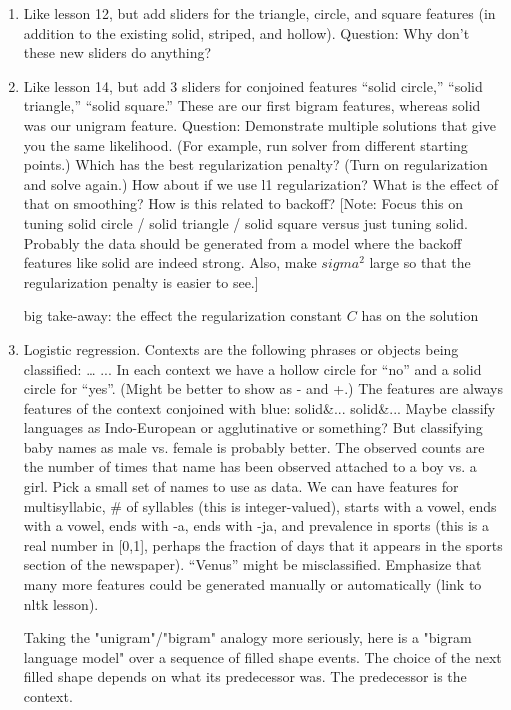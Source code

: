 \documentclass[11pt,letterpaper]{article}
\begin{document}
{\begin{enumerate}[resume]
In the English (circle) context, it is now only possible to talk about solid. Since English is popular, this means there are lots of solid shapes in our training data. Yet what are the weights that maxmize the conditional log-likelihood? Discuss why this is.
\item Like lesson 12, but add sliders for the triangle, circle, and square features (in addition to the existing solid, striped, and hollow).  Question: Why don’t these new sliders do anything?
\item Like lesson 14, but add 3 sliders for conjoined features “solid circle,” “solid triangle,” “solid square.”  These are our first bigram features, whereas solid was our unigram feature.  Question: Demonstrate multiple solutions that give you the same likelihood.  (For example, run solver from different starting points.)  Which has the best regularization penalty?   (Turn on regularization and solve again.)  How about if we use l1 regularization?  What is the effect of that on smoothing?  How is this related to backoff?  [Note: Focus this on tuning solid circle / solid triangle / solid square versus just tuning solid.  Probably the data should be generated from a model where the backoff features like solid are indeed strong.  Also, make $sigma^2$ large so that the regularization penalty is easier to see.] 

big take-away: the effect the regularization constant $C$ has on the solution
\item Logistic regression.  Contexts are the following phrases or objects being classified:
…
...
In each context we have a hollow circle for “no” and a solid circle for “yes”.  (Might be better to show as  - and +.)  The features are always features of the context conjoined with blue:
solid\&...
solid\&...
Maybe classify languages as Indo-European or agglutinative or something?  But classifying baby names as male vs. female is probably better.  The observed counts are the number of times that name has been observed attached to a boy vs. a girl.  Pick a small set of names to use as data.  We can have features for multisyllabic, \# of syllables (this is integer-valued), starts with a vowel, ends with a vowel, ends with -a, ends with -ja, and prevalence in sports (this is a real number in [0,1], perhaps the fraction of days that it appears in the sports section of the newspaper).  “Venus” might be misclassified.  Emphasize that many more features could be generated manually or automatically (link to nltk lesson).

Taking the "unigram"/"bigram" analogy more seriously, here is a "bigram language model" over a sequence of filled shape events. The choice of the next filled shape depends on what its predecessor was. The predecessor is the context.


\end{enumerate}}
\end{document}
